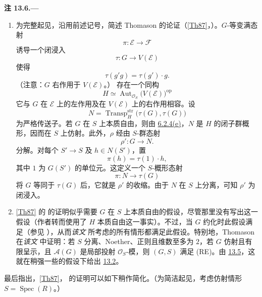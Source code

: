 \medskip
{}\label{rem:sga3-VIB-13.6}%
\noindent\textbf{注 13.6.---}
\begin{enumerate}
\item[\textup{(a)}]\label{rem:sga3-VIB-13.6-a}
  为完整起见，沿用前述记号，简述 Thomason 的论证\textup{（\hyperref[bib:sga3-VIB-Th87]{[Th87]}，）}。\(G\)-等变满态射
\[
    \pi:\mathcal E\longrightarrow\mathcal F
  \]
  诱导一个闭浸入
\[
    \tau:G\longrightarrow V(\mathcal E)
  \]
  使得
\[
    \tau(g'g)=\tau(g')\cdot g.
  \]
  \textup{（注意：\(G\) 右作用于 \(V(\mathcal E)\)。）}
  存在一个同构
\[
    H\simeq
    \operatorname{Aut}_{\mathcal O_S}
      \bigl(V(\mathcal E)\bigr)^{\mathrm{op}}
  \]
  它与 \(G\) 在 \(\mathcal E\) 上的左作用及在 \(V(\mathcal E)\) 上的右作用相容。设
\[
    N=\operatorname{Transp}^{\mathrm{str}}_H
      \bigl(\tau(G),\tau(G)\bigr)
  \]
  为严格传送子。若 \(G\) 在 \(S\) 上本质自由，则由 \hyperref[ex:sga3-VIB-6.2.4-e]{6.2.4(e)}，\(N\) 是 \(H\) 的闭子群概形，因而在 \(S\) 上仿射。此外，\(\rho\) 经由 \(S\)-群态射
\[
    \rho':G\longrightarrow N.
  \]
  分解。对每个 \(S'\to S\) 及 \(h\in N(S')\)，置
\[
    \pi(h)=\tau(1)\cdot h,
  \]
  其中 \(1\) 为 \(G(S')\) 的单位元。这定义一个 \(S\)-概形态射
\[
    \pi:N\longrightarrow\tau(G)
  \]
  将 \(G\) 等同于 \(\tau(G)\) 后，它就是 \(\rho'\) 的收缩。由于 \(N\) 在 \(S\) 上分离，可知 \(\rho'\) 为闭浸入。

\item[\textup{(b)}]\label{rem:sga3-VIB-13.6-b}
  \hyperref[bib:sga3-VIB-Th87]{[Th87]} 的 的证明似乎需要 \(G\) 在 \(S\) 上本质自由的假设，尽管那里没有写出这一假设\textup{（作者转而使用了 \(H\) 本质自由这一事实）}。不过，当 \(G\) 约化时此假设满足\textup{（参见 ）}，从而\emph{该文} 所考虑的所有情形都满足此假设。特别地，Thomason 在\emph{该文}  中证明：若 \(S\) 分离、Noether、正则且维数至多为 \(2\)，若 \(G\) 仿射且有限呈示，且 \(\mathcal A(G)\) 是局部投射 \(\mathcal O_S\)-模，则 \((G,S)\) 满足 \textup{(RE)}。由 \hyperref[prop:sga3-VIB-13.5]{13.5}，这就在稍强一些的假设下给出 \hyperref[prop:sga3-VIB-13.2]{13.2}。
\end{enumerate}

最后指出，\hyperref[bib:sga3-VIB-Th87]{[Th87]}， 的证明可以如下稍作简化。\textup{（为简洁起见，考虑仿射情形 \(S=\operatorname{Spec}(R)\)。）}


